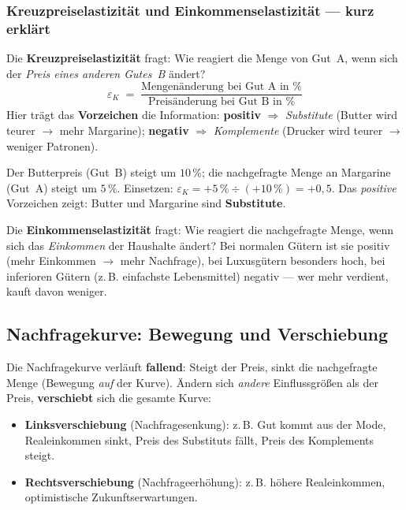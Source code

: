 \documentclass[11pt, a4paper]{article}
\begin{document}
\subsubsection{Kreuzpreiselastizität und Einkommenselastizität --- kurz erklärt}

Die \textbf{Kreuzpreiselastizität} fragt: Wie reagiert die Menge von Gut~A, wenn sich
der \emph{Preis eines anderen Gutes~B} ändert?
\[
\varepsilon_K \;=\; \frac{\text{Mengenänderung bei Gut A in \%}}{\text{Preisänderung bei Gut B in \%}}
\]
Hier trägt das \textbf{Vorzeichen} die Information: \textbf{positiv} $\Rightarrow$
\emph{Substitute} (Butter wird teurer $\rightarrow$ mehr Margarine); \textbf{negativ}
$\Rightarrow$ \emph{Komplemente} (Drucker wird teurer $\rightarrow$ weniger Patronen).

\begin{beispiel}[title={BEISPIEL: KREUZPREISELASTIZITÄT}]
Der Butterpreis (Gut~B) steigt um $10\,\%$; die nachgefragte Menge an Margarine
(Gut~A) steigt um $5\,\%$. Einsetzen:
$\varepsilon_K = +5\,\% \div (+10\,\%) = +0{,}5$. Das \emph{positive} Vorzeichen
zeigt: Butter und Margarine sind \textbf{Substitute}.
\end{beispiel}

Die \textbf{Einkommenselastizität} fragt: Wie reagiert die nachgefragte Menge, wenn
sich das \emph{Einkommen} der Haushalte ändert? Bei normalen Gütern ist sie positiv
(mehr Einkommen $\rightarrow$ mehr Nachfrage), bei Luxusgütern besonders hoch, bei
inferioren Gütern (z.\,B. einfachste Lebensmittel) negativ --- wer mehr verdient,
kauft davon weniger.

\subsection{Nachfragekurve: Bewegung und Verschiebung}

Die Nachfragekurve verläuft \textbf{fallend}: Steigt der Preis, sinkt die nachgefragte
Menge (Bewegung \emph{auf} der Kurve). Ändern sich \emph{andere} Einflussgrößen als der
Preis, \textbf{verschiebt} sich die gesamte Kurve:

\begin{itemize}
  \item \textbf{Linksverschiebung} (Nachfragesenkung): z.\,B. Gut kommt aus der Mode,
    Realeinkommen sinkt, Preis des Substituts fällt, Preis des Komplements steigt.
  \item \textbf{Rechtsverschiebung} (Nachfrageerhöhung): z.\,B. höhere Realeinkommen,
    optimistische Zukunftserwartungen.
\end{itemize}
\end{document}
